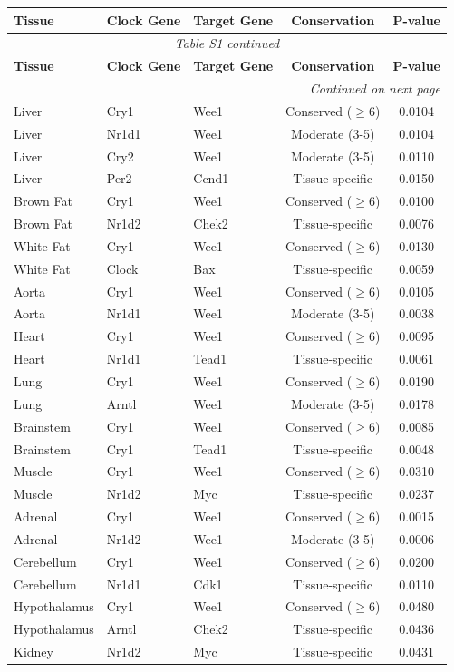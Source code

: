 \documentclass[11pt,letterpaper]{article}
\begin{document}
\begin{longtable}{lllcc}
\toprule
\textbf{Tissue} & \textbf{Clock Gene} & \textbf{Target Gene} & \textbf{Conservation} & \textbf{P-value} \\
\midrule
\endfirsthead
\multicolumn{5}{c}{\textit{Table S1 continued}} \\
\toprule
\textbf{Tissue} & \textbf{Clock Gene} & \textbf{Target Gene} & \textbf{Conservation} & \textbf{P-value} \\
\midrule
\endhead
\midrule
\multicolumn{5}{r}{\textit{Continued on next page}} \\
\endfoot
\bottomrule
\endlastfoot
Liver & Cry1 & Wee1 & Conserved ($\geq$6) & 0.0104 \\
Liver & Nr1d1 & Wee1 & Moderate (3-5) & 0.0104 \\
Liver & Cry2 & Wee1 & Moderate (3-5) & 0.0110 \\
Liver & Per2 & Ccnd1 & Tissue-specific & 0.0150 \\
Brown Fat & Cry1 & Wee1 & Conserved ($\geq$6) & 0.0100 \\
Brown Fat & Nr1d2 & Chek2 & Tissue-specific & 0.0076 \\
White Fat & Cry1 & Wee1 & Conserved ($\geq$6) & 0.0130 \\
White Fat & Clock & Bax & Tissue-specific & 0.0059 \\
Aorta & Cry1 & Wee1 & Conserved ($\geq$6) & 0.0105 \\
Aorta & Nr1d1 & Wee1 & Moderate (3-5) & 0.0038 \\
Heart & Cry1 & Wee1 & Conserved ($\geq$6) & 0.0095 \\
Heart & Nr1d1 & Tead1 & Tissue-specific & 0.0061 \\
Lung & Cry1 & Wee1 & Conserved ($\geq$6) & 0.0190 \\
Lung & Arntl & Wee1 & Moderate (3-5) & 0.0178 \\
Brainstem & Cry1 & Wee1 & Conserved ($\geq$6) & 0.0085 \\
Brainstem & Cry1 & Tead1 & Tissue-specific & 0.0048 \\
Muscle & Cry1 & Wee1 & Conserved ($\geq$6) & 0.0310 \\
Muscle & Nr1d2 & Myc & Tissue-specific & 0.0237 \\
Adrenal & Cry1 & Wee1 & Conserved ($\geq$6) & 0.0015 \\
Adrenal & Nr1d2 & Wee1 & Moderate (3-5) & 0.0006 \\
Cerebellum & Cry1 & Wee1 & Conserved ($\geq$6) & 0.0200 \\
Cerebellum & Nr1d1 & Cdk1 & Tissue-specific & 0.0110 \\
Hypothalamus & Cry1 & Wee1 & Conserved ($\geq$6) & 0.0480 \\
Hypothalamus & Arntl & Chek2 & Tissue-specific & 0.0436 \\
Kidney & Nr1d2 & Myc & Tissue-specific & 0.0431 \\
\end{longtable}
\end{document}

